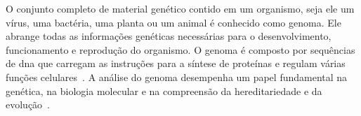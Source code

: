 O conjunto completo de material genético contido em um organismo, seja ele um vírus, uma bactéria, uma planta ou um animal é conhecido como genoma. Ele abrange todas as informações genéticas necessárias para o desenvolvimento, funcionamento e reprodução do organismo. O genoma é composto por sequências de \gls{dna} que carregam as instruções para a síntese de proteínas e regulam várias funções celulares~\cite{alberts_biologia_2017,genetics_benjamin_2016}. A análise do genoma desempenha um papel fundamental na genética, na biologia molecular e na compreensão da hereditariedade e da evolução~\cite{alberts_biologia_2017}.

